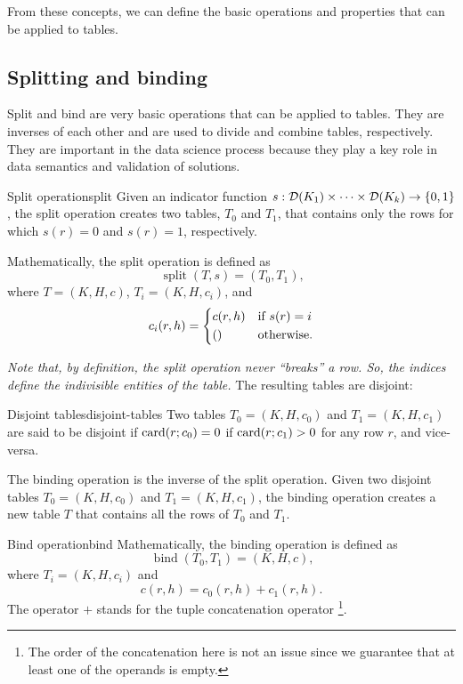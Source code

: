 From these concepts, we can define the basic operations and properties that can be applied
to tables.

\subsection{Splitting and binding}

Split and bind are very basic operations that can be applied to tables.  They are
inverses of each other and are used to divide and combine tables, respectively.
They are important in the data science process because they play a key role in
data semantics and validation of solutions.

\begin{defbox}{Split operation}{split}
Given an indicator function $s : \domainof{K_1} \times \dots \times \domainof{K_k} \to
\left\{0, 1\right\}$, the split operation creates two tables, $T_0$ and $T_1$, that
contains only the rows for which
$s(r) = 0$ and $s(r) = 1$, respectively.

Mathematically, the split operation is defined as \[
  \operatorname{split}(T, s) = \left(T_0, T_1\right)\text{,}
\] where $T = (K, H, c)$, $T_i = (K, H, c_i)$, and \[
  c_i(r, h) = \begin{dcases}
    c(r, h) & \text{if } s(r) = i \\
    () & \text{otherwise.}
  \end{dcases}
\]
\end{defbox}

\emph{Note that, by definition, the split operation never ``breaks'' a row.  So, the
indices define the indivisible entities of the table.}  The resulting tables are
disjoint:

\begin{defbox}{Disjoint tables}{disjoint-tables}
  Two tables $T_0 = (K, H, c_0)$ and $T_1 = (K, H, c_1)$ are said to be disjoint if
  $\rowcard[r; c_0] = 0$ if $\rowcard[r; c_1] > 0$ for any row $r$, and vice-versa.
\end{defbox}

The binding operation is the inverse of the split operation.  Given two disjoint tables
$T_0 = (K, H, c_0)$ and $T_1 = (K, H, c_1)$, the binding operation creates a new table $T$
that contains all the rows of $T_0$ and $T_1$.

\begin{defbox}{Bind operation}{bind}
  Mathematically, the binding operation is defined as \[
    \operatorname{bind}(T_0, T_1) = (K, H, c)\text{,}
  \] where $T_i = (K, H, c_i)$ and \[ c(r, h) = c_0(r, h) + c_1(r, h)\text{.} \]
  The operator $+$ stands for the tuple concatenation operator%
  \footnote{The order of the concatenation here is not an issue since we guarantee
  that at least one of the operands is empty.}.
\end{defbox}

